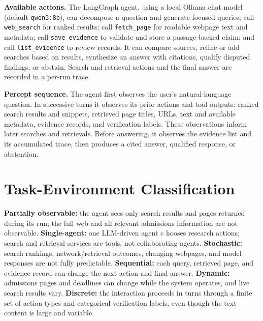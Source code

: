 \documentclass[conference]{IEEEtran}
\begin{document}
\textbf{Available actions.} The LangGraph agent, using a local Ollama chat model (default \texttt{qwen3:8b}), 
can decompose a question and generate focused queries; call \texttt{web\_search} for ranked results; 
call \texttt{fetch\_page} for readable webpage text and metadata; call \texttt{save\_evidence} 
to validate and store a passage-backed claim; and call \texttt{list\_evidence} to review records. 
It can compare sources, refine or add searches based on results, synthesize an answer with citations, 
qualify disputed findings, or abstain. Search and retrieval actions and the final answer are 
recorded in a per-run trace.

\textbf{Percept sequence.} The agent first observes the user's natural-language question. 
In successive turns it observes its prior actions and tool outputs: ranked search results 
and snippets, retrieved page titles, URLs, text and available metadata, evidence records, 
and verification labels. These observations inform later searches and retrievals. 
Before answering, it observes the evidence list and its accumulated trace, 
then produces a cited answer, qualified response, or abstention.

\section{Task-Environment Classification}
\textbf{Partially observable:} the agent sees only search results and pages 
returned during its run; the full web and all relevant admissions information 
are not observable. \textbf{Single-agent:} one LLM-driven agent c
hooses research actions; search and retrieval services are tools, 
not collaborating agents. \textbf{Stochastic:} search rankings, 
network/retrieval outcomes, changing webpages, and model responses 
are not fully predictable. \textbf{Sequential:} each query, retrieved page, 
and evidence record can change the next action and final answer. \textbf{Dynamic:} 
admissions pages and deadlines can change while the system operates, 
and live search results vary. \textbf{Discrete:} the interaction proceeds 
in turns through a finite set of action types and categorical verification 
labels, even though the text content is large and variable.
\end{document}

